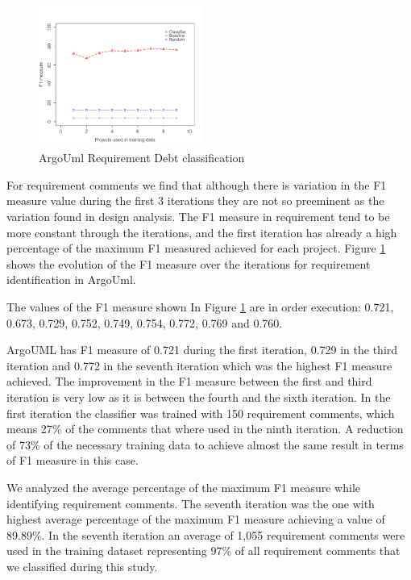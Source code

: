 \begin{figure}[thb!]
  \centering
  \includegraphics[width = 0.48\textwidth]{figures/implementation_argo.pdf}
  \vspace{-3mm}
  \caption{ArgoUml Requirement Debt classification}
  \label{fig:implementation_argo_result}
\end{figure}

For requirement \SATD comments we find that although there is variation in the F1 measure value during the first 3 iterations they are not so preeminent as the variation found in design \SATD analysis. The F1 measure in requirement \SATD tend to be more constant through the iterations, and the first iteration has already a high percentage of the maximum F1 measured achieved for each project. Figure \ref{fig:implementation_argo_result} shows the evolution of the F1 measure over the iterations for requirement \SATD identification in ArgoUml. 

The values of the F1 measure shown In Figure \ref{fig:implementation_argo_result} are in order execution: 0.721, 0.673, 0.729, 0.752, 0.749, 0.754, 0.772, 0.769 and 0.760.

ArgoUML has F1 measure of 0.721 during the first iteration, 0.729 in the third iteration and 0.772 in the seventh iteration which was the highest F1 measure achieved. The improvement in the F1 measure between the first and third iteration is very low as it is between the fourth and the sixth iteration. In the first iteration the classifier was trained with 150 requirement \SATD comments, which means 27\% of the comments that where used in the ninth iteration. A reduction of 73\% of the necessary training data to achieve almost the same result in terms of F1 measure in this case. 

We analyzed the average percentage of the maximum F1 measure while identifying requirement \SATD comments. The seventh iteration was the one with highest average percentage of the maximum F1 measure achieving a value of 89.89\%. In the seventh iteration an average of 1,055 requirement \SATD comments were used in the training dataset representing 97\% of all requirement \SATD comments that we classified during this study.

